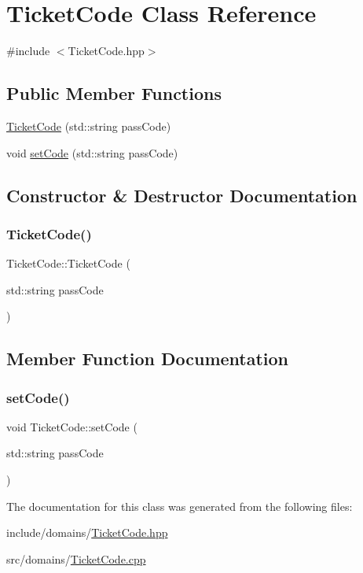 \hypertarget{class_ticket_code}{}\section{Ticket\+Code Class Reference}
\label{class_ticket_code}


{\ttfamily \#include $<$Ticket\+Code.\+hpp$>$}

\subsection*{Public Member Functions}
\begin{DoxyCompactItemize}
\item 
\mbox{\hyperlink{class_ticket_code_a00ffbbc42bf944095fb7c7f11e75ae1e}{Ticket\+Code}} (std\+::string pass\+Code)
\item 
void \mbox{\hyperlink{class_ticket_code_adc69c4ae676506637a192b213aa4230c}{set\+Code}} (std\+::string pass\+Code)
\end{DoxyCompactItemize}


\subsection{Constructor \& Destructor Documentation}
\mbox{\label{class_ticket_code_a00ffbbc42bf944095fb7c7f11e75ae1e}} 
\subsubsection{\texorpdfstring{TicketCode()}{TicketCode()}}
{\footnotesize\ttfamily Ticket\+Code\+::\+Ticket\+Code (\begin{DoxyParamCaption}\item[{std\+::string}]{pass\+Code }\end{DoxyParamCaption})}



\subsection{Member Function Documentation}
\mbox{\label{class_ticket_code_adc69c4ae676506637a192b213aa4230c}} 
\subsubsection{\texorpdfstring{setCode()}{setCode()}}
{\footnotesize\ttfamily void Ticket\+Code\+::set\+Code (\begin{DoxyParamCaption}\item[{std\+::string}]{pass\+Code }\end{DoxyParamCaption})}



The documentation for this class was generated from the following files\+:\begin{DoxyCompactItemize}
\item 
include/domains/\mbox{\hyperlink{_ticket_code_8hpp}{Ticket\+Code.\+hpp}}\item 
src/domains/\mbox{\hyperlink{domains_2_ticket_code_8cpp}{Ticket\+Code.\+cpp}}\end{DoxyCompactItemize}
